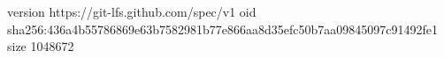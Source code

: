 version https://git-lfs.github.com/spec/v1
oid sha256:436a4b55786869e63b7582981b77e866aa8d35efc50b7aa09845097c91492fe1
size 1048672

